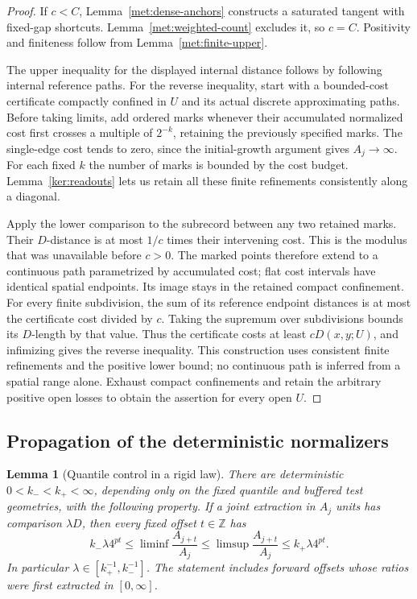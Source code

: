 \documentclass[11pt]{article}
\numberwithin{equation}{section}
\newtheorem{lemma}[theorem]{Lemma}
\theoremstyle{definition}
\theoremstyle{remark}
\newcommand{\Z}{\mathbb Z}
\newcommand{\1}{\mathbf 1}
\begin{document}
\begin{proof}
If $c<C$, Lemma~\ref{met:dense-anchors} constructs a saturated
tangent with fixed-gap shortcuts.  Lemma~\ref{met:weighted-count}
excludes it, so $c=C$.  Positivity and finiteness follow from
Lemma~\ref{met:finite-upper}.

The upper inequality for the displayed internal distance follows
by following internal reference paths.  For the reverse inequality,
start with a bounded-cost certificate compactly confined in $U$ and
its actual discrete approximating paths.  Before taking limits, add
ordered marks whenever their accumulated normalized cost first crosses
a multiple of $2^{-k}$, retaining the previously specified marks.
The single-edge cost tends to zero, since the initial-growth argument
gives $A_j\to\infty$.  For each fixed $k$ the number of marks is
bounded by the cost budget.  Lemma~\ref{ker:readouts} lets us retain
all these finite refinements consistently along a diagonal.

Apply the lower comparison to the subrecord between any two retained
marks.  Their $D$-distance is at most $1/c$ times their intervening
cost.  This is the modulus that was unavailable before $c>0$.
The marked points therefore extend to a continuous path parametrized
by accumulated cost; flat cost intervals have identical spatial
endpoints.  Its image stays in the retained compact confinement.
For every finite subdivision, the sum of its reference endpoint
distances is at most the certificate cost divided by $c$.  Taking
the supremum over subdivisions bounds its $D$-length by that value.
Thus the certificate costs at least $cD(x,y;U)$, and infimizing gives
the reverse inequality.  This construction uses consistent finite
refinements and the positive lower bound; no continuous path is
inferred from a spatial range alone.  Exhaust compact confinements and retain
the arbitrary positive open losses to obtain the assertion for
every open $U$.
\end{proof}

\subsection{Propagation of the deterministic normalizers}

\begin{lemma}[Quantile control in a rigid law]
\label{met:rigid-quantiles}
There are deterministic $0<k_-<k_+<\infty$, depending only on the
fixed quantile and buffered test geometries, with the following
property.  If a joint extraction in $A_j$ units has comparison
$\lambda D$, then every fixed offset $t\in\Z$ has
\begin{equation}
 k_-\lambda4^{pt}
 \leq \liminf\frac{A_{j+t}}{A_j}
 \leq \limsup\frac{A_{j+t}}{A_j}
 \leq k_+\lambda4^{pt}.
 \label{met:rigid-ratios}
\end{equation}
In particular $\lambda\in[k_+^{-1},k_-^{-1}]$.  The statement
includes forward offsets whose ratios were first extracted in
$[0,\infty]$.
\end{lemma}
\end{document}
